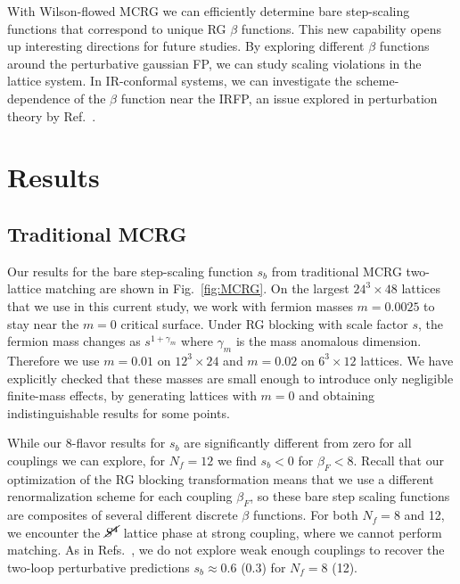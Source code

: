 \documentclass{PoS}
\newcommand{\be}{\ensuremath{\beta} }
\newcommand{\ga}{\ensuremath{\gamma} }
\newcommand{\X}{\ensuremath{\!\times\!} }
\newcommand{\Sb}{\ensuremath{\cancel{S^4}} }
\newcommand{\refcite}[1]{Ref.~\cite{#1}}
\newcommand{\fig}[1]{Fig.~\ref{#1}}
\begin{document}
With Wilson-flowed MCRG we can efficiently determine bare step-scaling functions that correspond to unique RG \be functions.
This new capability opens up interesting directions for future studies.
By exploring different \be functions around the perturbative gaussian FP, we can study scaling violations in the lattice system.
In IR-conformal systems, we can investigate the scheme-dependence of the \be function near the IRFP, an issue explored in perturbation theory by \refcite{Ryttov:2012nt}.



\section{Results} %
\subsection{\label{sec:MCRGresults}Traditional MCRG} %
Our results for the bare step-scaling function $s_b$ from traditional MCRG two-lattice matching are shown in \fig{fig:MCRG}.
On the largest $24^3\X48$ lattices that we use in this current study, we work with fermion masses $m = 0.0025$ to stay near the $m = 0$ critical surface.
Under RG blocking with scale factor $s$, the fermion mass changes as $s^{1 + \ga_m}$ where $\ga_m$ is the mass anomalous dimension.
Therefore we use $m = 0.01$ on $12^3\X24$ and $m = 0.02$ on $6^3\X12$ lattices.
We have explicitly checked that these masses are small enough to introduce only negligible finite-mass effects, by generating lattices with $m = 0$ and obtaining indistinguishable results for some points.

While our 8-flavor results for $s_b$ are significantly different from zero for all couplings we can explore, for $N_f = 12$ we find $s_b < 0$ for $\be_F < 8$.
Recall that our optimization of the RG blocking transformation means that we use a different renormalization scheme for each coupling $\be_F$, so these bare step scaling functions are composites of several different discrete \be functions.
For both $N_f = 8$ and 12, we encounter the \Sb lattice phase at strong coupling, where we cannot perform matching.
As in Refs.~\cite{Hasenfratz:2011xn, Hasenfratz:2011np}, we do not explore weak enough couplings to recover the two-loop perturbative predictions $s_b \approx 0.6$ (0.3) for $N_f = 8$ (12).
\end{document}
